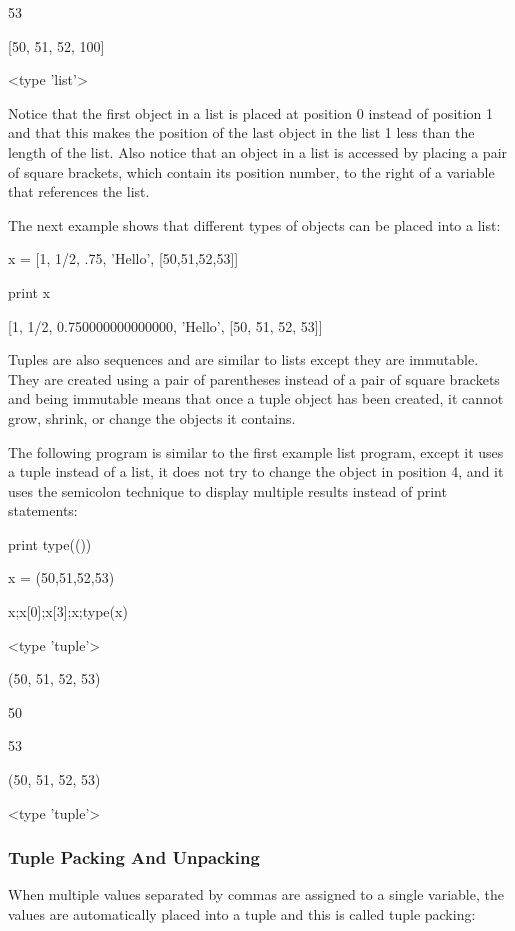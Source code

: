 \documentclass[12pt,oneside]{book}
\begin{document}
53

[50, 51, 52, 100]

{\textless}type 'list'{\textgreater}


Notice that the first object in a list is placed at position 0 instead of position 1 and that this makes the position of the last object in the list 1 less than the length of the list. Also notice that an object in a list is accessed by placing a pair of square brackets, which contain its position number, to the right of a variable that references the list.

The next example shows that different types of objects can be placed into a list: 

x = [1, 1/2, .75, 'Hello', [50,51,52,53]]

print x

{\textbar}

[1, 1/2, 0.750000000000000, 'Hello', [50, 51, 52, 53]]

Tuples are also sequences and are similar to lists except they are immutable. They are created using a pair of parentheses instead of a pair of square brackets and being immutable means that once a tuple object has been created, it cannot grow, shrink, or change the objects it contains. 

The following program is similar to the first example list program, except it uses a tuple instead of a list, it does not try to change the object in position 4, and it uses the semicolon technique to display multiple results instead of print statements: 

print type(())

x = (50,51,52,53)

x;x[0];x[3];x;type(x)

{\textbar}

{\textless}type 'tuple'{\textgreater}

(50, 51, 52, 53)

50

53

(50, 51, 52, 53)

{\textless}type 'tuple'{\textgreater}


\subsubsection[Tuple Packing And Unpacking]{Tuple Packing And Unpacking}

When multiple values separated by commas are assigned to a single variable, the values are automatically placed into a tuple and this is called tuple packing: 
\end{document}
